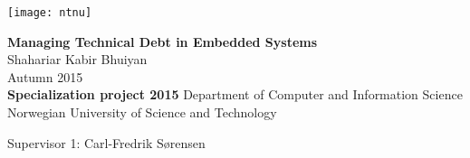 
\thispagestyle{empty}
\texttt{[image: ntnu]}
\mbox{}\\[6pc]
\begin{center}
\Huge{\textbf{Managing Technical Debt in Embedded Systems}}\\[4pc]
\Large{Shahariar Kabir Bhuiyan}\\[1pc]
\large{Autumn 2015}\\[2pc]

\textbf{Specialization project 2015}
\linebreak
Department of Computer and Information Science\\
Norwegian University of Science and Technology
\end{center}
\vfill

\noindent Supervisor 1: Carl-Fredrik Sørensen


